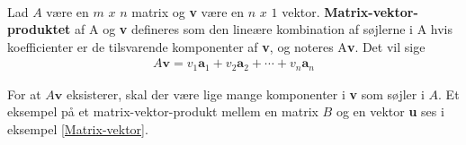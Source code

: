 \begin{defn}{}{}
\phantom{gdfs}\\Lad $A$ være en $m$ $x$ $n$ matrix og \textbf{v} være en $n$ $x$ $1$ vektor. \textbf{Matrix-vektor-produktet} af A og \textbf{v} defineres som den lineære kombination af søjlerne i A hvis koefficienter er de tilsvarende komponenter af \textbf{v}, og noteres A\textbf{v}. Det vil sige
\begin{align*}
A\textbf{v} =v_1\textbf{a}_1 + v_2\textbf{a}_2 + \cdots + v_n\textbf{a}_n
\end{align*}
\end{defn}
\noindent
For at $A\textbf{v}$ eksisterer, skal der være lige mange komponenter i \textbf{v} som søjler i $A$. Et eksempel på et matrix-vektor-produkt mellem en matrix $B$ og en vektor \textbf{u} ses i eksempel \ref{Matrix-vektor}.
